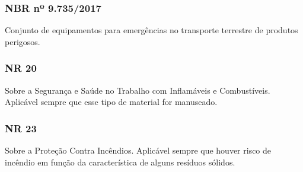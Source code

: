 \begin{subapend}
\begin{subsubapend}
		\subsubsection{NBR nº 9.735/2017}
		Conjunto de equipamentos para emergências no transporte terrestre de produtos perigosos.
	
		\subsubsection{NR 20}
		Sobre a Segurança e Saúde no Trabalho com Inflamáveis e Combustíveis. Aplicável sempre que esse tipo de material for manuseado.
	
		\subsubsection{NR 23}
		Sobre a Proteção Contra Incêndios. Aplicável sempre que houver risco de incêndio em função da característica de alguns resíduos sólidos.
	\end{subsubapend}
\end{subapend}

